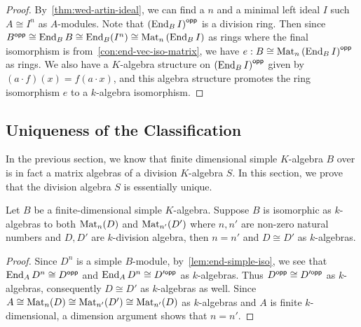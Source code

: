 \begin{proof}
  By~\cref{thm:wed-artin-ideal}, we can find a $n$ and a minimal left ideal $I$
  such $A \cong I^{n}$ as $A$-modules. Note that
  ${\left(\operatorname{End}_{B}I\right)}^{\mathsf{opp}}$ is a division ring. Then since
  $B^{\mathsf{opp}}\cong\operatorname{End}_{B}B\cong{\operatorname{End}_{B}(I^{n})}\cong\operatorname{Mat}_{n}\left(\operatorname{End}_{B}I\right)$
  as rings where the final isomorphism is from~\cref{con:end-vec-iso-matrix}, we
  have $e : B\cong \operatorname{Mat}_{n}\left(\operatorname{End}_{B}I\right)^{\mathsf{opp}}$ as rings. We also have
  a $K$-algebra structure on ${\left(\operatorname{End}_{B} I\right)}^{\mathsf{opp}}$ given by
  $(a \cdot f)(x)=f(a\cdot x)$, and this algebra structure promotes the ring
  isomorphism $e$ to a $k$-algebra isomorphism.
\end{proof}

\subsection{Uniqueness of the Classification}\label{sec:wed-artin-unique}
In the previous section, we know that finite dimensional simple $K$-algebra $B$
over is in fact a matrix algebras of a division $K$-algebra $S$. In this
section, we prove that the division algebra $S$ is essentially unique.

\begin{theorem}\label{thm:wed-artin-uniq}
  Let $B$ be a
  finite-dimensional simple $K$-algebra. Suppose $B$ is isomorphic as
  $k$-algebras to both $\operatorname{Mat}_{n}(D)$ and $\operatorname{Mat}_{n'}(D')$ where $n, n'$ are
  non-zero natural numbers and $D, D'$ are $k$-division algebra, then $n = n'$
  and $D \cong D'$ as $k$-algebras.\label{thm:wed-artin-unique} \leanok
\end{theorem}

\begin{proof}
  Since $D^{n}$ is a simple $B$-module, by~\cref{lem:end-simple-iso}, we see
  that $\operatorname{End}_{A}D^{n}\cong D^{\mathsf{opp}}$ and $\operatorname{End}_{A}D^{n}\cong D'^{\mathsf{opp}}$ as
  $k$-algebras. Thus $D^{\mathsf{opp}}\cong D'^{\mathsf{opp}}$ as $k$-algebras, consequently
  $D\cong D'$ as $k$-algebras as well. Since
  $A \cong \operatorname{Mat}_{n}(D)\cong \operatorname{Mat}_{n'}(D')\cong \operatorname{Mat}_{n'}(D)$ as $k$-algebras and
  $A$ is finite $k$-dimensional, a dimension argument shows that $n=n'$.
\end{proof}

